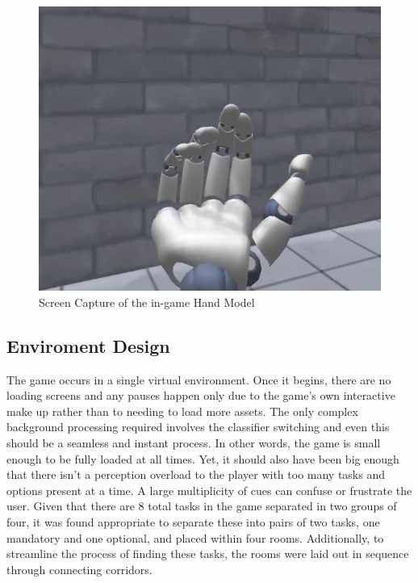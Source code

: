     \begin{figure}[ht]
        \centering                                                
        \includegraphics[width=0.3\paperwidth]{figures/HandIngame.png}
        \caption{\label{fig:FigureHand}Screen Capture of the in-game Hand Model}               
    \end{figure}

\subsection{Enviroment Design} \label{sec:develop_game_enviroment}

    The game occurs in a single virtual environment. Once it begins, there are no loading screens and any pauses happen only due to the game’s own interactive make up rather than to needing to load more assets. The only complex background processing required involves the classifier switching and even this should be a seamless and instant process. In other words, the game is small enough to be fully loaded at all times.
    Yet, it should also have been big enough that there isn’t a perception overload to the player with too many tasks and options present at a time. A large multiplicity of cues can confuse or frustrate the user. Given that there are 8 total tasks in the game separated in two groups of four, it was found appropriate to separate these into pairs of two tasks, one mandatory and one optional, and placed within four rooms. Additionally, to streamline the process of finding these tasks, the rooms were laid out in sequence through connecting corridors.\\
    
